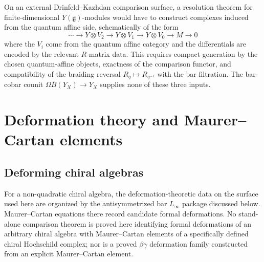 \begin{remark}
\label{rem:yangian-module-resolution-scope}
On an external Drinfeld--Kazhdan comparison surface, a resolution
theorem for finite-dimensional $Y(\mathfrak{g})$-modules would have
to construct complexes induced from the quantum affine side,
schematically of the form
\[
\cdots \to Y \otimes V_2 \to Y \otimes V_1 \to Y \otimes V_0 \to M \to 0
\]
where the $V_i$ come from the quantum affine category and the
differentials are encoded by the relevant $R$-matrix data.  This
requires compact generation by the chosen quantum-affine objects,
exactness of the comparison functor, and compatibility of the
braiding reversal $R_q\mapsto R_{q^{-1}}$ with the bar filtration.
The bar-cobar counit $\Omega\bar B(Y_X)\to Y_X$ supplies none of
these three inputs.
\end{remark}


\section{Deformation theory and Maurer--Cartan elements}

\subsection{Deforming chiral algebras}

\begin{remark}
\label{rem:nonquadratic-deformation-scope}
For a non-quadratic chiral algebra, the deformation-theoretic data on
the surface used here are organized by the antisymmetrized
bar $L_\infty$ package discussed below. Maurer--Cartan equations
there record candidate formal deformations.  No stand-alone
comparison theorem is proved here identifying formal deformations of
an arbitrary chiral algebra with
Maurer--Cartan elements of a specifically defined chiral Hochschild
complex; nor is a proved $\beta\gamma$ deformation family
constructed from an explicit Maurer--Cartan element.
\end{remark}


